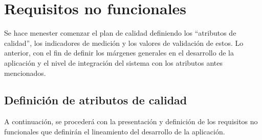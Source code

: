 
\chapter{Requisitos no funcionales}

Se hace menester comenzar el plan de calidad definiendo los “atributos de calidad”, los indicadores de medición y los valores de validación de estos. Lo anterior, con el fin de definir los márgenes generales en el desarrollo de la aplicación y el nivel de integración del sistema con los atributos antes mencionados.

\section{Definición de atributos de calidad}

A continuación, se procederá con la presentación y definición de los requisitos no funcionales que definirán el lineamiento del desarrollo de la aplicación.

